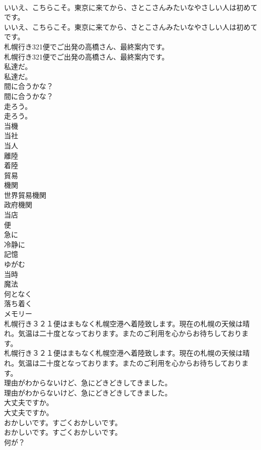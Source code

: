 \documentclass[8pt]{extreport}
\begin{document}
\begin{CJK}{UTF8}{min}
\\	いいえ、こちらこそ。東京に来てから、さとこさんみたいなやさしい人は初めてです。	
\\	いいえ、こちらこそ。東京に来てから、さとこさんみたいなやさしい人は初めてです。 
\\	札幌行き321便でご出発の高橋さん、最終案内です。	
\\	札幌行き321便でご出発の高橋さん、最終案内です。 
\\	私達だ。	
\\	私達だ。 
\\	間に合うかな？	
\\	間に合うかな？ 
\\	走ろう。	
\\	走ろう。 
\\	当機
\\	当社
\\	当人
\\	離陸
\\	着陸
\\	貿易
\\	機関
\\	世界貿易機関
\\	政府機関
\\	当店
\\	便
\\	急に
\\	冷静に
\\	記憶
\\	ゆがむ
\\	当時
\\	魔法
\\	何となく
\\	落ち着く
\\	メモリー
\\	札幌行き３２１便はまもなく札幌空港へ着陸致します。現在の札幌の天候は晴れ。気温は二十度となっております。またのご利用を心からお待ちしております。	
\\	札幌行き３２１便はまもなく札幌空港へ着陸致します。現在の札幌の天候は晴れ。気温は二十度となっております。またのご利用を心からお待ちしております。 
\\	理由がわからないけど、急にどきどきしてきました。	
\\	理由がわからないけど、急にどきどきしてきました。 
\\	大丈夫ですか。	
\\	大丈夫ですか。 
\\	おかしいです。すごくおかしいです。	
\\	おかしいです。すごくおかしいです。 
\\	何が？	

\end{CJK}
\end{document}
